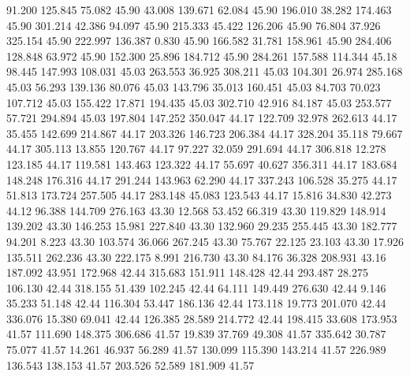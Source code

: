   91.200  125.845   75.082        45.90
  43.008  139.671   62.084        45.90
 196.010   38.282  174.463        45.90
 301.214   42.386   94.097        45.90
 215.333   45.422  126.206        45.90
  76.804   37.926  325.154        45.90
 222.997  136.387    0.830        45.90
 166.582   31.781  158.961        45.90
 284.406  128.848   63.972        45.90
 152.300   25.896  184.712        45.90
 284.261  157.588  114.344        45.18
  98.445  147.993  108.031        45.03
 263.553   36.925  308.211        45.03
 104.301   26.974  285.168        45.03
  56.293  139.136   80.076        45.03
 143.796   35.013  160.451        45.03
  84.703   70.023  107.712        45.03
 155.422   17.871  194.435        45.03
 302.710   42.916   84.187        45.03
 253.577   57.721  294.894        45.03
 197.804  147.252  350.047        44.17
 122.709   32.978  262.613        44.17
  35.455  142.699  214.867        44.17
 203.326  146.723  206.384        44.17
 328.204   35.118   79.667        44.17
 305.113   13.855  120.767        44.17
  97.227   32.059  291.694        44.17
 306.818   12.278  123.185        44.17
 119.581  143.463  123.322        44.17
  55.697   40.627  356.311        44.17
 183.684  148.248  176.316        44.17
 291.244  143.963   62.290        44.17
 337.243  106.528   35.275        44.17
  51.813  173.724  257.505        44.17
 283.148   45.083  123.543        44.17
  15.816   34.830   42.273        44.12
  96.388  144.709  276.163        43.30
  12.568   53.452   66.319        43.30
 119.829  148.914  139.202        43.30
 146.253   15.981  227.840        43.30
 132.960   29.235  255.445        43.30
 182.777   94.201    8.223        43.30
 103.574   36.066  267.245        43.30
  75.767   22.125   23.103        43.30
  17.926  135.511  262.236        43.30
 222.175    8.991  216.730        43.30
  84.176   36.328  208.931        43.16
 187.092   43.951  172.968        42.44
 315.683  151.911  148.428        42.44
 293.487   28.275  106.130        42.44
 318.155   51.439  102.245        42.44
  64.111  149.449  276.630        42.44
   9.146   35.233   51.148        42.44
 116.304   53.447  186.136        42.44
 173.118   19.773  201.070        42.44
 336.076   15.380   69.041        42.44
 126.385   28.589  214.772        42.44
 198.415   33.608  173.953        41.57
 111.690  148.375  306.686        41.57
  19.839   37.769   49.308        41.57
 335.642   30.787   75.077        41.57
  14.261   46.937   56.289        41.57
 130.099  115.390  143.214        41.57
 226.989  136.543  138.153        41.57
 203.526   52.589  181.909        41.57
